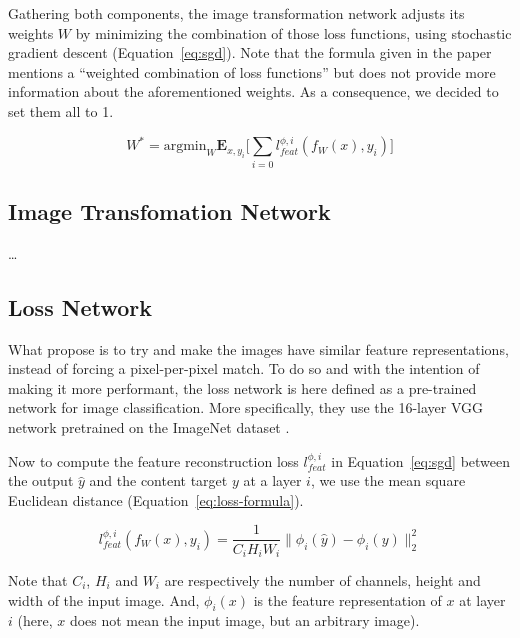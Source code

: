 \documentclass{article}
\begin{document}
{    \bigskip

    Gathering both components, the image transformation network adjusts its weights $W$ by minimizing the combination of those loss functions, using stochastic gradient descent (Equation~\ref{eq:sgd}). Note that the formula given in the paper \citep{sr} mentions a “weighted combination of loss functions” but does not provide more information about the aforementioned weights. As a consequence, we decided to set them all to 1.

    \begin{equation}
        W^* =
        \text{argmin}_W \textbf{E}_{x,y_i}
        \biggl[
            \sum_{i=0} l^{\phi, i}_{feat}(f_W(x), y_i)
            \biggr]
        \label{eq:sgd}
    \end{equation}

    \subsection{Image Transfomation Network}
    \label{subsec:image-transform-net}


    …

    \subsection{Loss Network}
    \label{subsec:loss-net}

    What propose \cite{sr} is to try and make the images have similar feature representations, instead of forcing a pixel-per-pixel match. To do so and with the intention of making it more performant, the loss network is here defined as a pre-trained network for image classification. More specifically, they use the 16-layer VGG network \citep{vgg} pretrained on the ImageNet dataset \citep{image-net}.

    Now to compute the feature reconstruction loss $l^{\phi, i}_{feat}$ in Equation~\ref{eq:sgd} between the output $\hat y$ and the content target $y$ at a layer $i$, we use the mean square Euclidean distance (Equation~\ref{eq:loss-formula}).

    \begin{equation}
        l^{\phi, i}_{feat}(f_W(x), y_i) =
        \frac{1}{C_i H_i W_i}
        \lVert
        \phi_i (\hat y) - \phi_i (y)
        \rVert_2^2
        \label{eq:loss-formula}
    \end{equation}

    Note that $C_i$, $H_i$ and $W_i$ are respectively the number of channels, height and width of the input image. And, $\phi_i (x)$ is the feature representation of $x$ at layer $i$ (here, $x$ does not mean the input image, but an arbitrary image).
}
\end{document}
